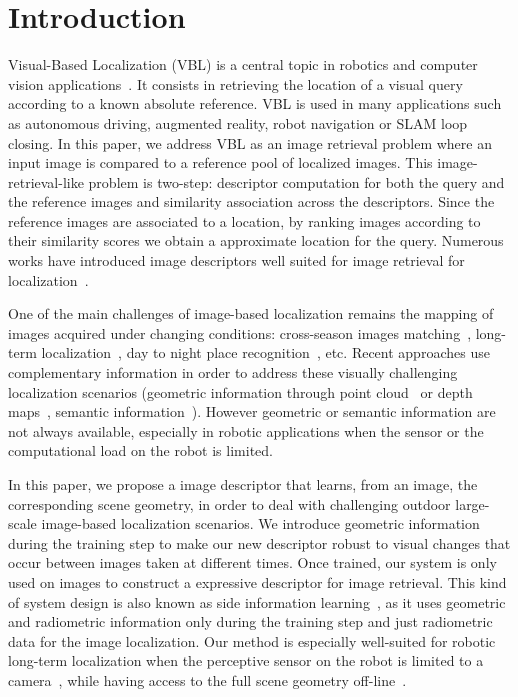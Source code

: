 \section{Introduction}
\label{sec:intro}

Visual-Based Localization (VBL) is a central topic in robotics and computer vision applications~\cite{Piasco2017}. It consists in retrieving the location of a visual query according to a known absolute reference. VBL is used in many applications such as autonomous driving, augmented reality, robot navigation or SLAM loop closing. In this paper, we address VBL as an image retrieval problem where an input image is compared to a reference pool of localized images. This image-retrieval-like problem is two-step: descriptor computation for both the query and the reference images and similarity association across the descriptors. Since the reference images are associated to a location, by ranking images according to their similarity scores we obtain a approximate location for the query. Numerous works have introduced image descriptors well suited for image retrieval for localization~\cite{Arandjelovic2017,Kim2017a,Gordo2017,Radenovic2017,Liu2018}. 

One of the main challenges of image-based localization remains the mapping of images acquired under changing conditions: cross-season images matching~\cite{Naseer2017a}, long-term localization~\cite{Toft2018}, day to night place recognition~\cite{Torii2015}, etc. Recent approaches use complementary information in order to address these visually challenging localization scenarios (geometric information through point cloud~\cite{Sattler2018,Schonberger2018} or depth maps~\cite{Christie2016}, semantic information~\cite{Ardeshir2014,Christie2016,Naseer2017a}). However geometric or semantic information are not always available, especially in robotic applications when the sensor or the computational load on the robot is limited.

In this paper, we propose a image descriptor that learns, from an image, the corresponding scene geometry, in order to deal with challenging outdoor large-scale image-based localization scenarios. We introduce geometric information during the training step to make our new descriptor robust to visual changes that occur between images taken at different times. Once trained, our system is only used on images to construct a expressive descriptor for image retrieval. This kind of system design is also known as side information learning~\cite{Hoffman2016}, as it uses geometric and radiometric information only during the training step and just radiometric data for the image localization. Our method is especially well-suited for robotic long-term localization when the perceptive sensor on the robot is limited to a camera~\cite{Middelberg2014}, while having access to the full scene geometry off-line~\cite{Paparoditis2012,Maddern2016,Wang2016}. 

